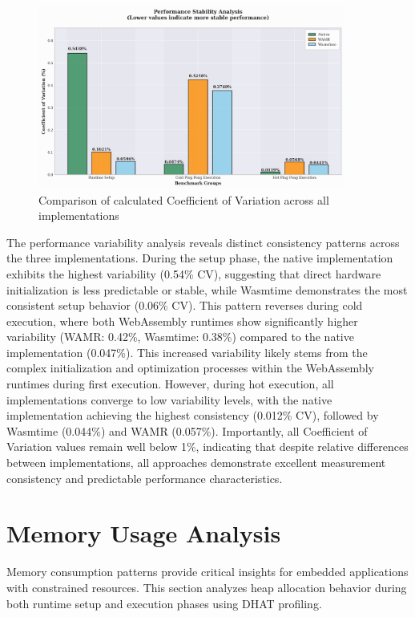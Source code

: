 \begin{figure}[htbp]
    \centering
    \includegraphics[width=0.9\textwidth]{images/variability-comparison}
    \caption{Comparison of calculated Coefficient of Variation across all implementations}
    \label{fig:variability-comparison}
\end{figure}

The performance variability analysis reveals distinct consistency patterns across the three implementations. During the setup phase, the native implementation exhibits the highest variability (0.54\% CV), suggesting that direct hardware initialization is less predictable or stable, while Wasmtime demonstrates the most consistent setup behavior (0.06\% CV). This pattern reverses during cold execution, where both WebAssembly runtimes show significantly higher variability (WAMR: 0.42\%, Wasmtime: 0.38\%) compared to the native implementation (0.047\%). This increased variability likely stems from the complex initialization and optimization processes within the WebAssembly runtimes during first execution. However, during hot execution, all implementations converge to low variability levels, with the native implementation achieving the highest consistency (0.012\% CV), followed by Wasmtime (0.044\%) and WAMR (0.057\%). Importantly, all Coefficient of Variation values remain well below 1\%, indicating that despite relative differences between implementations, all approaches demonstrate excellent measurement consistency and predictable performance characteristics.

\section{Memory Usage Analysis}
\label{sec:eval-memory}

Memory consumption patterns provide critical insights for embedded applications with constrained resources. This section analyzes heap allocation behavior during both runtime setup and execution phases using DHAT profiling.


